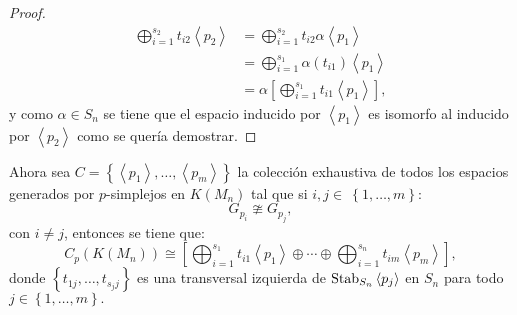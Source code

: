 \documentclass[12pt]{book}
\theoremstyle{definition}
\newcounter{in}
\begin{document}
\begin{proof}
\begin{equation}
\begin{aligned}
\bigoplus_{i=1}^{s_{2}} t_{i2} \left \langle p_{2} \right \rangle & = \bigoplus_{i=1}^{s_{2}} t_{i2} \alpha  \left \langle p_{1} \right \rangle \\
& = \bigoplus_{i=1}^{s_{1}} \alpha (t_{i1})  \left \langle p_{1} \right \rangle \\
& = \alpha \left [ \bigoplus_{i=1}^{s_{1}} t_{i1} \left \langle p_{1} \right \rangle \right ],
\end{aligned}
\end{equation}
y como $\alpha \in S_{n}$ se tiene que el espacio inducido por $\left
\langle p_{1} \right \rangle$ es isomorfo al inducido por $ \left
\langle p_{2} \right \rangle$ como se quería demostrar. 
\end{proof}

Ahora sea $C = \left \{ \left \langle p_{1} \right \rangle,\ldots,
\left \langle p_{m} \right \rangle \right \}$ la colección exhaustiva
de todos los espacios generados por $p$-simplejos en $K(M_{n})$ tal
que si $i,j \in~\left \{ 1,\ldots,m \right \}$:
$$G_{p_{i}} \ncong G_{p_{j}},$$
con $i \neq j$, entonces se tiene que:
\begin{equation}
C_{p}(K(M_{n})) \cong \left [ \bigoplus_{i=1}^{s_{1}} t_{i1} \left \langle p_{1} \right \rangle \oplus \cdots \oplus \bigoplus_{i=1}^{s_{n}} t_{im} \left \langle p_{m} \right \rangle \right ],
\end{equation}
donde $\left \{ t_{1j}, \ldots, t_{s_{j}j} \right \}$ es una
transversal izquierda de $\textup{Stab}_{S_{n}} \left \langle p_{j}
\right \rangle$ en $S_{n}$ para todo $j \in \left \{ 1,\ldots,m \right
\}.$
\end{document}
